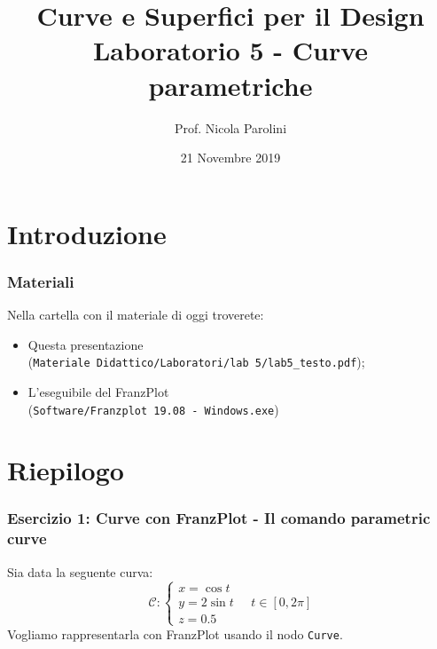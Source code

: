 \documentclass{beamer}
\title[Curve e Sup. - Lab 5]{Curve e Superfici per il Design \\ Laboratorio 5 - Curve parametriche}
\author[Prof.ssa Scotti]{Prof. Nicola Parolini}
\date{21 Novembre 2019}
\newcommand{\frnzplt}{FranzPlot }
\begin{document}
\begin{frame}
\maketitle
\end{frame}
\section{Introduzione}
\begin{frame}
\frametitle{Materiali}
Nella cartella con il materiale di oggi troverete:
\begin{itemize}
\item Questa presentazione \\ (\texttt{Materiale Didattico/Laboratori/lab 5/lab5\_testo.pdf});
\item L'eseguibile del \frnzplt \\ (\texttt{Software/Franzplot 19.08 - Windows.exe})
\end{itemize}
\end{frame}

\section{Riepilogo}
%
\begin{frame}
\frametitle{Esercizio 1: Curve con \frnzplt - Il comando parametric curve}
Sia data la seguente curva:
\begin{displaymath}
\mathcal C:
\begin{cases}
    x = \cos t\\
    y = 2 \sin t \\
    z = 0.5
\end{cases}
    \quad
    t \in [0, 2\pi]
\end{displaymath}
    Vogliamo rappresentarla con \frnzplt usando il nodo \texttt{Curve}.
\end{frame}
%
\end{document}
